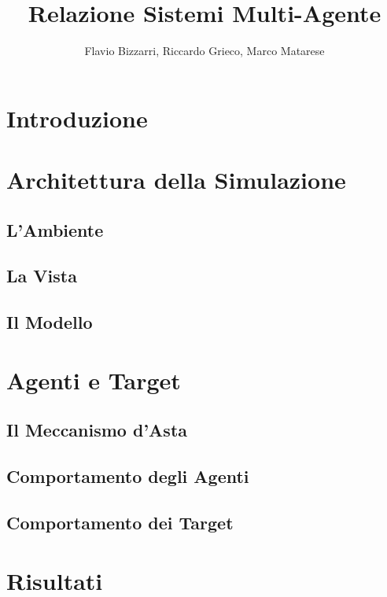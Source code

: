 \documentclass[12pt]{article}
\title{Relazione Sistemi Multi-Agente}
\author{Flavio Bizzarri, Riccardo Grieco, Marco Matarese}
\begin{document}

\newpage

\tableofcontents

\newpage

\section{Introduzione}


\newpage

\section{Architettura della Simulazione}
	\subsection{L'Ambiente}
	
	\subsection{La Vista}
	
	\subsection{Il Modello}
	
	
	\newpage

\section{Agenti e Target}
	\subsection{Il Meccanismo d'Asta}
	
	\subsection{Comportamento degli Agenti}
	
	\subsection{Comportamento dei Target}
	
	
	\newpage
	
\section{Risultati}

\end{document}
